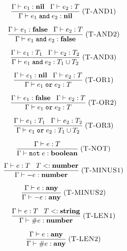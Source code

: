 \documentclass[12pt]{article}
\newcommand{\Any}{\mathbf{any}}
\newcommand{\Nil}{\mathbf{nil}}
\newcommand{\False}{\mathbf{false}}
\newcommand{\Boolean}{\mathbf{boolean}}
\newcommand{\Number}{\mathbf{number}}
\newcommand{\String}{\mathbf{string}}
\newcommand{\kw}[1]{\mathbf{\texttt{#1}}}
\newcommand{\mylabel}[1]{\; (\textsc{#1})}
\newcommand{\subtype}{<:}
\newcommand{\env}{\Gamma}
\begin{document}
\[
\frac{\env \vdash e_{1}:\Nil \;\;\;
      \env \vdash e_{2}:T}
     {\env \vdash e_{1} \; \kw{and} \; e_{2} : \Nil}
\mylabel{T-AND1}
\]

\[
\frac{\env \vdash e_{1}:\False \;\;\;
      \env \vdash e_{2}:T}
     {\env \vdash e_{1} \; \kw{and} \; e_{2} : \False}
\mylabel{T-AND2}
\]

\[
\frac{\env \vdash e_{1}:T_{1} \;\;\;
      \env \vdash e_{2}:T_{2}}
     {\env \vdash e_{1} \; \kw{and} \; e_{2} : T_{1} \cup T_{2}}
\mylabel{T-AND3}
\]

\[
\frac{\env \vdash e_{1}:\Nil \;\;\;
      \env \vdash e_{2}:T}
     {\env \vdash e_{1} \; \kw{or} \; e_{2} : T}
\mylabel{T-OR1}
\]

\[
\frac{\env \vdash e_{1}:\False \;\;\;
      \env \vdash e_{2}:T}
     {\env \vdash e_{1} \; \kw{or} \; e_{2} : T}
\mylabel{T-OR2}
\]

\[
\frac{\env \vdash e_{1}:T_{1} \;\;\;
      \env \vdash e_{2}:T_{2}}
     {\env \vdash e_{1} \; \kw{or} \; e_{2} : T_{1} \cup T_{2}}
\mylabel{T-OR3}
\]

\[
\frac{\env \vdash e:T}
     {\env \vdash \kw{not} \; e : \Boolean}
\mylabel{T-NOT}
\]

\[
\frac{\env \vdash e:T \;\;\;
      T \subtype \Number}
     {\env \vdash - e : \Number}
\mylabel{T-MINUS1}
\]

\[
\frac{\env \vdash e:\Any}
     {\env \vdash - e : \Any}
\mylabel{T-MINUS2}
\]

\[
\frac{\env \vdash e:T \;\;\;
      T \subtype \String}
     {\env \vdash \# e : \Number}
\mylabel{T-LEN1}
\]

\[
\frac{\env \vdash e:\Any}
     {\env \vdash \# e : \Any}
\mylabel{T-LEN2}
\]
\end{document}
